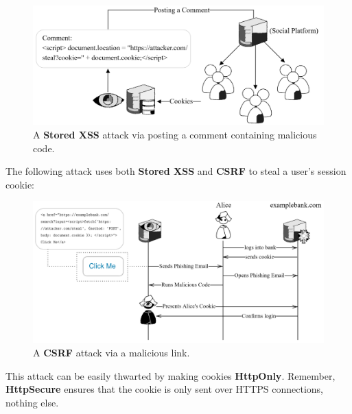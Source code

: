 \begin{figure}[h!]
    \centering
    \includegraphics[width=.9\textwidth]{Sections/attk/cookie.png}
    \caption{A \textbf{Stored XSS} attack via posting a comment containing malicious code.}
    \label{fig:cookies}
\end{figure}

\newpage 

\noindent
The following attack uses both \textbf{Stored XSS} and \textbf{CSRF} to steal a user's session cookie:\\

\vspace{1em}


\begin{figure}[h!]
    \centering
    \hspace{-3em}
    \includegraphics[width=1\textwidth]{Sections/attk/both.png}
    \caption{A \textbf{CSRF} attack via a malicious link.}
    \label{fig:csrf}
\end{figure}

\noindent
This attack can be easily thwarted by making cookies \textbf{HttpOnly}. Remember, \textbf{HttpSecure}
ensures that the cookie is only sent over HTTPS connections, nothing else.

